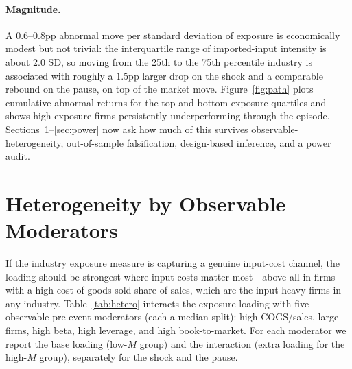 \documentclass[12pt]{article}
\begin{document}
\paragraph{Magnitude.} A $0.6$--$0.8$pp abnormal move per standard deviation of exposure is
economically modest but not trivial: the interquartile range of imported-input intensity is
about 2.0 SD, so moving from the 25th to the 75th percentile industry is associated with
roughly a $1.5$pp larger drop on the shock and a comparable rebound on the pause, on top of
the market move. Figure~\ref{fig:path} plots cumulative abnormal returns for the top and
bottom exposure quartiles and shows high-exposure firms persistently underperforming through
the episode. Sections~\ref{sec:het}--\ref{sec:power} now ask how much of this survives
observable-heterogeneity, out-of-sample falsification, design-based inference, and a power
audit.

\section{Heterogeneity by Observable Moderators}\label{sec:het}
If the industry exposure measure is capturing a genuine input-cost channel, the loading
should be strongest where input costs matter most---above all in firms with a high
cost-of-goods-sold share of sales, which are the input-heavy firms in any industry.
Table~\ref{tab:hetero} interacts the exposure loading with five observable pre-event
moderators (each a median split): high COGS/sales, large firms, high beta, high leverage, and
high book-to-market. For each moderator we report the base loading (low-$M$ group) and the
interaction (extra loading for the high-$M$ group), separately for the shock and the pause.
\end{document}
